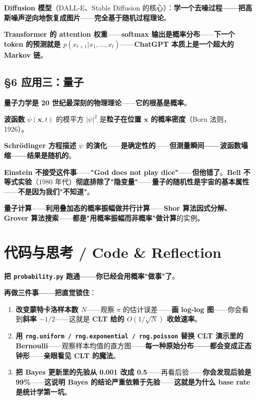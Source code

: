 \textbf{Diffusion 模型}（DALL-E、Stable Diffusion 的核心）：\textbf{学一个去噪过程——把高斯噪声逆向地恢复成图片}——\textbf{完全基于随机过程理论}。

\textbf{Transformer 的 attention 权重}——\textbf{softmax 输出是概率分布}——\textbf{下一个 token 的预测就是 $p(x_{t+1} | x_1, \dots, x_t)$}——\textbf{ChatGPT 本质上是一个超大的 Markov 链}。

\subsection{§6 应用三：量子}

\textbf{量子力学是 20 世纪最深刻的物理理论}——\textbf{它的根基是概率}。

\textbf{波函数} $\psi(\bm{x}, t)$ 的模平方 $|\psi|^2$ 是\textbf{粒子在位置 $\bm{x}$ 的概率密度}（Born 法则，1926）。

\textbf{Schrödinger 方程描述 $\psi$ 的演化}——\textbf{是确定性的}——\textbf{但测量瞬间——波函数塌缩——结果是随机的}。

\textbf{Einstein 不接受这件事}——\textbf{"God does not play dice"}——\textbf{但他错了}。\textbf{Bell 不等式实验}（1980 年代）\textbf{彻底排除了"隐变量"}——\textbf{量子的随机性是宇宙的基本属性}——\textbf{不是因为我们"不知道"}。

\textbf{量子计算}——\textbf{利用叠加态的概率振幅做并行计算}——\textbf{Shor 算法因式分解、Grover 算法搜索}——\textbf{都是"用概率振幅而非概率"做计算}的实例。

\section{代码与思考 / Code \& Reflection}

\textbf{把 \texttt{probability.py} 跑通——你已经会用概率"做事"了}。

\textbf{再做三件事——把直觉锁住}：

\begin{enumerate}
\item \textbf{改变蒙特卡洛样本数 $N$}——观察 $\pi$ 的估计误差——\textbf{画 log-log 图}——你会看到\textbf{斜率 $-1/2$}——这就是 \textbf{CLT 给的 $O(1/\sqrt{N})$ 收敛速率}。

\item \textbf{用 \texttt{rng.uniform / rng.exponential / rng.poisson} 替换 CLT 演示里的 Bernoulli}——观察样本均值的直方图——\textbf{每一种原始分布——都会变成正态钟形}——\textbf{亲眼看见 CLT 的魔法}。

\item \textbf{把 Bayes 更新里的先验从 0.001 改成 0.5}——再看后验——\textbf{你会发现后验是 99\%}——\textbf{这说明 Bayes 的结论严重依赖于先验}——\textbf{这就是为什么 base rate 是统计学第一坑}。
\end{enumerate}

